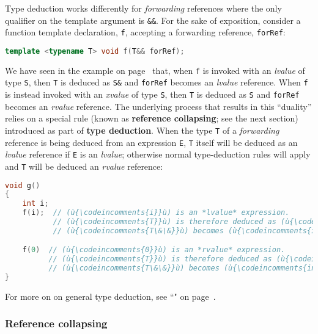 \noindent Type deduction works differently for \emph{forwarding} references 
where the only qualifier on the template argument is \texttt{\&\&}. For
the sake of exposition, consider a function template declaration,
\texttt{f}, accepting a forwarding reference, \texttt{forRef}:

\begin{lstlisting}[language=C++]
template <typename T> void f(T&& forRef);
\end{lstlisting}
    
\noindent We have seen in the example on page~\pageref{f-invoked-example} that, 
when \texttt{f} is invoked with an
\emph{lvalue} of type \texttt{S}, then \texttt{T} is deduced as
\texttt{S\&} and \texttt{forRef} becomes an \emph{lvalue} reference.
When \texttt{f} is instead invoked with an \emph{xvalue} of type
\texttt{S}, then \texttt{T} is deduced as \texttt{S} and
\texttt{forRef} becomes an \emph{rvalue} reference. The underlying
process that results in this ``duality'' relies on a special rule (known
as \textbf{reference collapsing}; see the next section) introduced as part of
\textbf{type deduction}. When the type \texttt{T} of a
\emph{forwarding} reference is being deduced from an expression
\texttt{E}, \texttt{T} itself will be deduced as an \emph{lvalue}
reference if \texttt{E} is an \emph{lvalue}; otherwise normal
type-deduction rules will apply and \texttt{T} will be deduced an \emph{rvalue}
reference:

\begin{lstlisting}[language=C++]
void g()
{
    int i;
    f(i);  // (ù{\codeincomments{i}}ù) is an *lvalue* expression.
           // (ù{\codeincomments{T}}ù) is therefore deduced as (ù{\codeincomments{int\&}}ù) -- special rule!
           // (ù{\codeincomments{T\&\&}}ù) becomes (ù{\codeincomments{int\& \&\&}}ù), which collapses to (ù{\codeincomments{int\&}}ù).

    f(0)  // (ù{\codeincomments{0}}ù) is an *rvalue* expression.
          // (ù{\codeincomments{T}}ù) is therefore deduced as (ù{\codeincomments{int}}ù).
          // (ù{\codeincomments{T\&\&}}ù) becomes (ù{\codeincomments{int\&\&}}ù), which is an *rvalue* reference.
}
\end{lstlisting}
    
\noindent For more on on general type deduction, see ``" on page~\pageref{auto-feature}.

\subsubsection[Reference collapsing]{Reference collapsing}\label{reference-collapsing}

